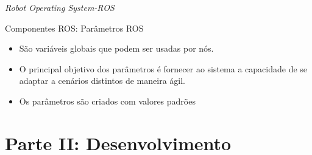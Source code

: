 \documentclass[10pt]{beamer}
\begin{document}
\begin{frame}{\textit{Robot Operating System-ROS}}
	\begin{alertblock}{Componentes ROS: Parâmetros ROS}
		\vspace{1cm}
		\begin{itemize}
			\setlength\itemsep{1.4em}
			\item São variáveis globais que podem ser usadas por nós.
			\item O principal objetivo dos parâmetros é fornecer ao sistema a capacidade de	se adaptar a cenários distintos de maneira ágil.
			\item Os parâmetros são	criados com valores padrões
		\end{itemize}
	\end{alertblock}
\end{frame}



\section{Parte II: Desenvolvimento}

\end{document}
